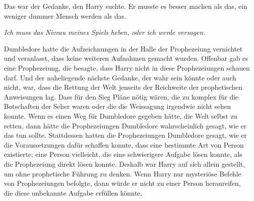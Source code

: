 Das war der Gedanke, den Harry suchte. Er musste es besser machen als das, ein weniger dummer Mensch werden als das.

\emph{Ich muss das Niveau meines Spiels heben, oder ich werde versagen.}

Dumbledore hatte die Aufzeichnungen in der Halle der Prophezeiung vernichtet und veranlasst, dass keine weiteren Aufnahmen gemacht wurden. Offenbar gab es eine Prophezeiung, die besagte, dass Harry nicht in diese Prophezeiungen schauen darf. Und der naheliegende nächste Gedanke, der wahr sein könnte oder auch nicht, war, dass die Rettung der Welt jenseits der Reichweite der prophetischen Anweisungen lag. Dass für den Sieg Pläne nötig wären, die zu komplex für die Botschaften der Seher waren oder die die Weissagung irgendwie nicht sehen konnte. Wenn es einen Weg für Dumbledore gegeben hätte, die Welt selbst zu retten, dann hätte die Prophezeiungen Dumbledore wahrscheinlich gesagt, wie er das tun sollte. Stattdessen hatten die Prophezeiungen Dumbledore gesagt, wie er die Voraussetzungen dafür schaffen konnte, dass eine bestimmte Art von Person existierte; eine Person vielleicht, die eine schwierigere Aufgabe lösen konnte, als die Prophezeiung direkt lösen konnte. Deshalb war Harry auf sich allein gestellt, um ohne prophetische Führung zu denken. Wenn Harry nur mysteriöse Befehle von Prophezeiungen befolgte, dann würde er nicht zu einer Person heranreifen, die diese unbekannte Aufgabe erfüllen könnte.

